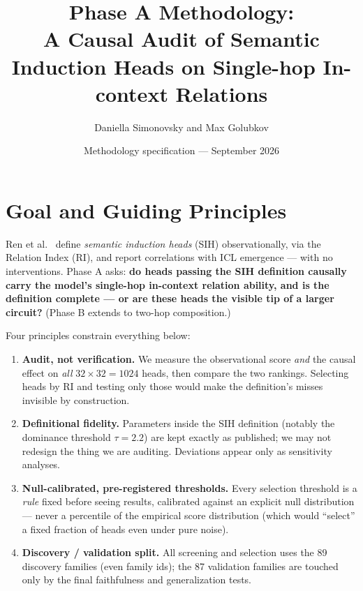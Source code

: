 \documentclass[11pt,a4paper]{article}
\title{Phase A Methodology:\\ A Causal Audit of Semantic Induction Heads on Single-hop In-context Relations}
\author{Daniella Simonovsky and Max Golubkov}
\date{Methodology specification --- September 2026}
\begin{document}
\maketitle

\section{Goal and Guiding Principles}
Ren et al.~\cite{ren} define \emph{semantic induction heads} (SIH) observationally, via the Relation Index (RI), and report correlations with ICL emergence --- with no interventions. Phase A asks: \textbf{do heads passing the SIH definition causally carry the model's single-hop in-context relation ability, and is the definition complete --- or are these heads the visible tip of a larger circuit?} (Phase B extends to two-hop composition.)

Four principles constrain everything below:
\begin{enumerate}[itemsep=1pt]
\item \textbf{Audit, not verification.} We measure the observational score \emph{and} the causal effect on \emph{all} $32\times32=1024$ heads, then compare the two rankings. Selecting heads by RI and testing only those would make the definition's misses invisible by construction.
\item \textbf{Definitional fidelity.} Parameters inside the SIH definition (notably the dominance threshold $\tau=2.2$) are kept exactly as published; we may not redesign the thing we are auditing. Deviations appear only as sensitivity analyses.
\item \textbf{Null-calibrated, pre-registered thresholds.} Every selection threshold is a \emph{rule} fixed before seeing results, calibrated against an explicit null distribution --- never a percentile of the empirical score distribution (which would ``select'' a fixed fraction of heads even under pure noise).
\item \textbf{Discovery / validation split.} All screening and selection uses the 89 discovery families (even family ids); the 87 validation families are touched only by the final faithfulness and generalization tests.
\end{enumerate}
\end{document}

